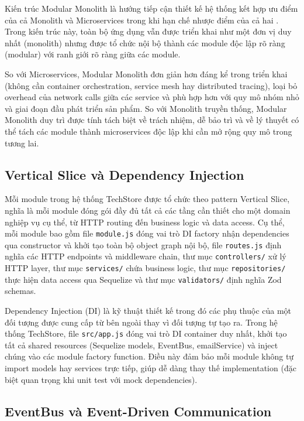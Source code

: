 Kiến trúc Modular Monolith là hướng tiếp cận thiết kế hệ thống kết hợp ưu điểm của cả Monolith và Microservices trong khi hạn chế nhược điểm của cả hai \cite{newman2019monolith}. Trong kiến trúc này, toàn bộ ứng dụng vẫn được triển khai như một đơn vị duy nhất (monolith) nhưng được tổ chức nội bộ thành các module độc lập rõ ràng (modular) với ranh giới rõ ràng giữa các module.

So với Microservices, Modular Monolith đơn giản hơn đáng kể trong triển khai (không cần container orchestration, service mesh hay distributed tracing), loại bỏ overhead của network calls giữa các service và phù hợp hơn với quy mô nhóm nhỏ và giai đoạn đầu phát triển sản phẩm. So với Monolith truyền thống, Modular Monolith duy trì được tính tách biệt về trách nhiệm, dễ bảo trì và về lý thuyết có thể tách các module thành microservices độc lập khi cần mở rộng quy mô trong tương lai.

\subsection{Vertical Slice và Dependency Injection}

Mỗi module trong hệ thống TechStore được tổ chức theo pattern Vertical Slice, nghĩa là mỗi module đóng gói đầy đủ tất cả các tầng cần thiết cho một domain nghiệp vụ cụ thể, từ HTTP routing đến business logic và data access. Cụ thể, mỗi module bao gồm file \texttt{module.js} đóng vai trò DI factory nhận dependencies qua constructor và khởi tạo toàn bộ object graph nội bộ, file \texttt{routes.js} định nghĩa các HTTP endpoints và middleware chain, thư mục \texttt{controllers/} xử lý HTTP layer, thư mục \texttt{services/} chứa business logic, thư mục \texttt{repositories/} thực hiện data access qua Sequelize và thư mục \texttt{validators/} định nghĩa Zod schemas.

Dependency Injection (DI) là kỹ thuật thiết kế trong đó các phụ thuộc của một đối tượng được cung cấp từ bên ngoài thay vì đối tượng tự tạo ra. Trong hệ thống TechStore, file \texttt{src/app.js} đóng vai trò DI container duy nhất, khởi tạo tất cả shared resources (Sequelize models, EventBus, emailService) và inject chúng vào các module factory function. Điều này đảm bảo mỗi module không tự import models hay services trực tiếp, giúp dễ dàng thay thế implementation (đặc biệt quan trọng khi unit test với mock dependencies).

\subsection{EventBus và Event-Driven Communication}

